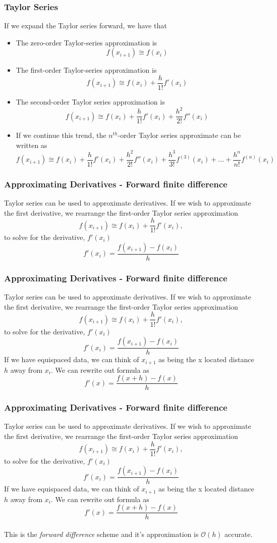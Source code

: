 \documentclass{if-beamer}
\begin{document}
\begin{frame}[t]
	\frametitle{Taylor Series}
	
	If we expand the Taylor series forward, we have that 
	\begin{itemize}
		\item 	The zero-order Taylor-series approximation is
		$$f(x_{i+1}) \cong f(x_i) $$
		\item The first-order Taylor-series approximation is
		$$f(x_{i+1}) \cong f(x_i) +\frac{h}{1!}f'(x_i) $$
		\item The second-order Taylor series approximation is 
		$$f(x_{i+1}) \cong f(x_i) +\frac{h}{1!}f'(x_i) + \frac{h^2}{2!}f''(x_i)$$
		\item If we continue this trend, the $n^{th}$-order Taylor series approximate can be written as
		$$f(x_{i+1}) \cong f(x_i) + \frac{h}{1!}f'(x_i) + \frac{h^2}{2!}f''(x_i)+\frac{h^3}{3!}f^{(3)}(x_i)+...+\frac{h^n}{n!}f^{(n)}(x_i)$$
	\end{itemize}	
\end{frame}


\begin{frame}[t]
	\frametitle{Approximating Derivatives - Forward finite difference}
	Taylor series can be used to approximate derivatives. If we wish to approximate the first derivative, we rearrange the first-order Taylor series approximation
	$$f(x_{i+1}) \cong f(x_i)+ \frac{h}{1!}f'(x_i),$$
	to solve for the derivative, $f'(x_i)$
	$$f'(x_i) = \frac{f(x_{i+1})-f(x_i)}{h} $$
\end{frame}

\begin{frame}[t]
	\frametitle{Approximating Derivatives - Forward finite difference}
	Taylor series can be used to approximate derivatives. If we wish to approximate the first derivative, we rearrange the first-order Taylor series approximation
	$$f(x_{i+1}) \cong f(x_i)+ \frac{h}{1!}f'(x_i),$$
	to solve for the derivative, $f'(x_i)$
	$$f'(x_i) = \frac{f(x_{i+1})-f(x_i)}{h} $$
	If we have equispaced data, we can think of $x_{i+1}$ as being the x located distance $h$ away from $x_i$. We can rewrite out formula as
	$$f'(x) = \frac{f(x+h)-f(x)}{h}  $$
	
\end{frame}

\begin{frame}[t]
	\frametitle{Approximating Derivatives - Forward finite difference}
	Taylor series can be used to approximate derivatives. If we wish to approximate the first derivative, we rearrange the first-order Taylor series approximation
	$$f(x_{i+1}) \cong f(x_i)+ \frac{h}{1!}f'(x_i),$$
	to solve for the derivative, $f'(x_i)$
	$$f'(x_i) = \frac{f(x_{i+1})-f(x_i)}{h} $$
	If we have equispaced data, we can think of $x_{i+1}$ as being the x located distance $h$ away from $x_i$. We can rewrite out formula as
	$$f'(x) = \frac{f(x+h)-f(x)}{h}  $$
	\\\vspace{10pt}
	This is the \textit{forward difference} scheme and it's approximation is $\mathcal{O}(h)$ accurate.
\end{frame}
\end{document}

